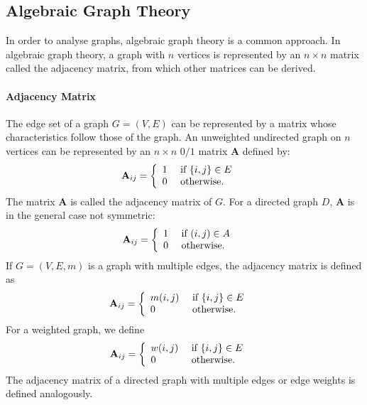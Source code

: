 \documentclass[11pt,a4paper]{book}
\begin{document}
\subsection{Algebraic Graph Theory}
\label{sec:spectral-graph-theory}
In order to analyse graphs, algebraic graph theory is a common
approach.  In algebraic graph theory, a graph with $n$ vertices is
represented by an $n\times n$ matrix called the adjacency matrix, from
which other matrices can be derived.   

\paragraph{Adjacency Matrix} 
The edge set of a graph $G=(V,E)$ can be represented by a matrix whose 
characteristics follow those of the graph.  An unweighted undirected graph on $n$
vertices can be represented by an $n\times n$ $0/1$ matrix $\mathbf A$
defined by:
\begin{align}
  \mathbf A_{ij} &= \left\{ \begin{array}{ll} 1 & \textnormal{ if } \{i,j\} \in
    E \\ 0 & \textnormal{ otherwise. } \end{array} \right. 
  \label{eq:adjacency-matrix}
\end{align}
The matrix $\mathbf A$ is called the adjacency matrix of $G$. 
For a directed graph $D$, 
$\mathbf A$ is in the general case not symmetric:
\begin{align}
  \mathbf A_{ij} &= \left\{ \begin{array}{ll} 1 & \textnormal{ if } (i,j) \in
    A \\ 0 & \textnormal{ otherwise. } \end{array} \right. 
\end{align}
If $G=(V,E,m)$ is a graph with multiple edges, the adjacency matrix is defined as
\begin{align}
  \mathbf A_{ij} &= \left\{ \begin{array}{ll} m(i,j) & \textnormal{ if }
    \{i,j\} \in 
    E  \\ 0 & \textnormal{
      otherwise. } \end{array} \right.  
\end{align}
For a weighted graph, we define
\begin{align}
  \mathbf A_{ij} &= \left\{ \begin{array}{ll} w(i,j) & \textnormal{ if }
    \{i,j\} \in 
    E  \\ 0 & \textnormal{
      otherwise. } \end{array} \right.  
\end{align}
The adjacency matrix of a directed graph with multiple edges or edge
weights is defined analogously.
\end{document}
